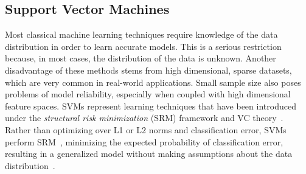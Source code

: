 \subsection{Support Vector Machines}\label{subsec:svms}
Most classical machine learning techniques require knowledge of the data distribution in order to learn accurate models. This is a serious restriction because, in most cases, the distribution of the data is unknown. Another disadvantage of these methods stems from high dimensional, sparse datasets, which are very common in real-world applications. Small sample size also poses problems of model reliability, especially when coupled with high dimensional feature spaces. SVMs represent learning techniques that have been introduced under the \textit{structural risk minimization} (SRM) framework and VC theory~\citep{Kecman2001}. Rather than optimizing over L1 or L2 norms and classification error, SVMs perform SRM~\citep{Shalev2014}, minimizing the expected probability of classification error, resulting in a generalized model without making assumptions about the data distribution~\citep{Cortes1995}. 

